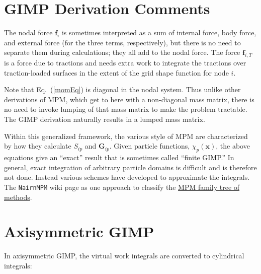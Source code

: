 \documentclass[11pt]{article}
\renewcommand{\vec}[1]{\boldsymbol{#1}}
\begin{document}
\section{GIMP Derivation Comments}

The nodal force $\vec f_i$ is sometimes interpreted as a sum of internal force, body force, and external force (for the three terms, respectively), but there is no need to separate them during calculations; they all add to the nodal force. The force $\vec f_{i,T}$ is a force due to tractions and needs extra work to integrate the tractions over traction-loaded surfaces in the extent of the grid shape function for node $i$.

Note that Eq.~(\ref{momEq}) is diagonal in the nodal system. Thus unlike other derivations of MPM, which get to here with a non-diagonal mass matrix, there is no need to invoke lumping of that mass matrix to make the problem tractable. The GIMP derivation naturally results in a lumped mass matrix.

Within this generalized framework, the various style of MPM are characterized by how they calculate $S_{ip}$ and $\vec G_{ip}$. Given particle functions, $\chi_p(\vec x)$, the above equations give an ``exact'' result that is sometimes called ``finite GIMP.'' In general, exact integration of arbitrary particle domains is difficult and is therefore not done. Instead various schemes have developed to approximate the integrals. The {\tt NairnMPM} wiki page as one approach to classify the \href{http://osupdocs.forestry.oregonstate.edu/index.php/MPM_Methods_and_Simulation_Timing}{MPM family tree of methods}.

\section{Axisymmetric GIMP}

\def\avgrp{\langle r_p\rangle}

In axisymmetric GIMP, the virtual work integrals are converted to cylindrical integrals:
\end{document}
